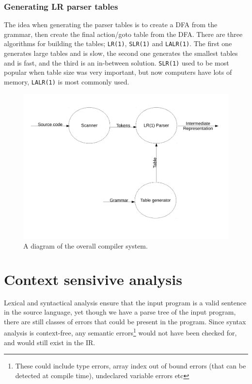 \subsubsection{Generating LR parser tables}

The idea when generating the parser tables is to create a DFA from the grammar,
then create the final action/goto table from the DFA. There are three algorithms
for building the tables; \texttt{LR(1)}, \texttt{SLR(1)} and \texttt{LALR(1)}.
The first one generates large tables and is slow, the second one generates the
smallest tables and is fast, and the third is an in-between solution.
\texttt{SLR(1)} used to be most popular when table size was very important, but
now computers have lots of memory, \texttt{LALR(1)} is most commonly used.


\begin{figure}
  \includegraphics[width=\textwidth]{diagrams/big-picture-1}
  \caption{A diagram of the overall compiler system.}
\end{figure}




\section{Context sensivive analysis}

Lexical and syntactical analysis ensure that the input program is a
valid sentence in the source language, yet though we have a parse tree
of the input program, there are still classes of errors that could be
present in the program. Since syntax analysis is context-free, any
semantic errors\footnote{These could include type errors, array index
out of bound errors (that can be detected at compile time), undeclared
variable errors etc} would not have been checked for, and would still
exist in the IR.

